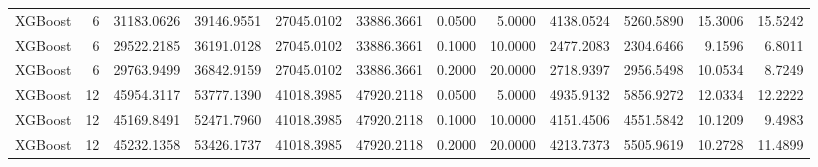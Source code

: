 \begin{tabular}{lrrrrrrrrrrr}
XGBoost & 6 & 31183.0626 & 39146.9551 & 27045.0102 & 33886.3661 & 0.0500 & 5.0000 & 4138.0524 & 5260.5890 & 15.3006 & 15.5242 \\
XGBoost & 6 & 29522.2185 & 36191.0128 & 27045.0102 & 33886.3661 & 0.1000 & 10.0000 & 2477.2083 & 2304.6466 & 9.1596 & 6.8011 \\
XGBoost & 6 & 29763.9499 & 36842.9159 & 27045.0102 & 33886.3661 & 0.2000 & 20.0000 & 2718.9397 & 2956.5498 & 10.0534 & 8.7249 \\
XGBoost & 12 & 45954.3117 & 53777.1390 & 41018.3985 & 47920.2118 & 0.0500 & 5.0000 & 4935.9132 & 5856.9272 & 12.0334 & 12.2222 \\
XGBoost & 12 & 45169.8491 & 52471.7960 & 41018.3985 & 47920.2118 & 0.1000 & 10.0000 & 4151.4506 & 4551.5842 & 10.1209 & 9.4983 \\
XGBoost & 12 & 45232.1358 & 53426.1737 & 41018.3985 & 47920.2118 & 0.2000 & 20.0000 & 4213.7373 & 5505.9619 & 10.2728 & 11.4899 \\
\bottomrule
\end{tabular}
